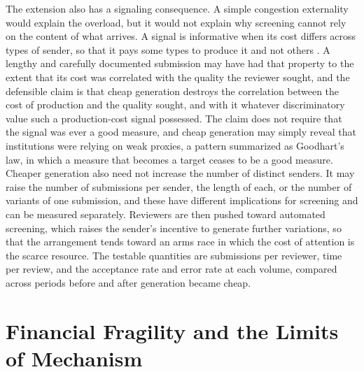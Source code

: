 \documentclass[12pt]{article}
\begin{document}
The extension also has a signaling consequence. A simple congestion externality would explain the overload, but it would not explain why screening cannot rely on the content of what arrives. A signal is informative when its cost differs across types of sender, so that it pays some types to produce it and not others \cite{spence}. A lengthy and carefully documented submission may have had that property to the extent that its cost was correlated with the quality the reviewer sought, and the defensible claim is that cheap generation destroys the correlation between the cost of production and the quality sought, and with it whatever discriminatory value such a production-cost signal possessed. The claim does not require that the signal was ever a good measure, and cheap generation may simply reveal that institutions were relying on weak proxies, a pattern summarized as Goodhart's law, in which a measure that becomes a target ceases to be a good measure. Cheaper generation also need not increase the number of distinct senders. It may raise the number of submissions per sender, the length of each, or the number of variants of one submission, and these have different implications for screening and can be measured separately. Reviewers are then pushed toward automated screening, which raises the sender's incentive to generate further variations, so that the arrangement tends toward an arms race in which the cost of attention is the scarce resource. The testable quantities are submissions per reviewer, time per review, and the acceptance rate and error rate at each volume, compared across periods before and after generation became cheap.

\section{Financial Fragility and the Limits of Mechanism}
\end{document}
